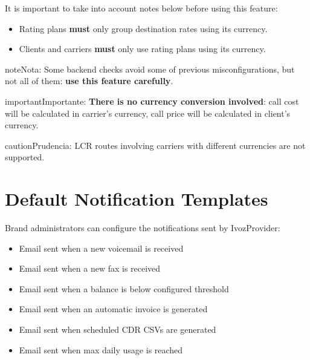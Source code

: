 \documentclass[letterpaper,10pt,spanish]{sphinxmanual}
\begin{document}
It is important to take into account notes below before using this feature:
\begin{itemize}
\item {} 
Rating plans \textbf{must} only group destination rates using its currency.

\item {} 
Clients and carriers \textbf{must} only use rating plans using its currency.

\end{itemize}

\begin{notice}{note}{Nota:}
Some backend checks avoid some of previous misconfigurations, but not all of them: \textbf{use this feature carefully}.
\end{notice}

\begin{notice}{important}{Importante:}
\textbf{There is no currency conversion involved}: call cost will be calculated in carrier's currency, call price
will be calculated in client's currency.
\end{notice}

\begin{notice}{caution}{Prudencia:}
LCR routes involving carriers with different currencies are not supported.
\end{notice}


\section{Default Notification Templates}
\label{administration_portal/platform/default_notification_templates::doc}\label{administration_portal/platform/default_notification_templates:default-notification-templates}\label{administration_portal/platform/default_notification_templates:id1}
Brand administrators can configure the notifications sent by IvozProvider:
\begin{itemize}
\item {} 
Email sent when a new voicemail is received

\item {} 
Email sent when a new fax is received

\item {} 
Email sent when a balance is below configured threshold

\item {} 
Email sent when an automatic invoice is generated

\item {} 
Email sent when scheduled CDR CSVs are generated

\item {} 
Email sent when max daily usage is reached

\end{itemize}
\end{document}
